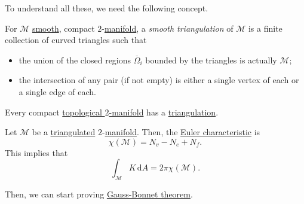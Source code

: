 To understand all these, we need the following concept.

\begin{definition}\label{def:smooth-triangulation}
	For \(\mathcal{M} \) \hyperref[def:smooth-manifold]{smooth}, compact \(2\)-\hyperref[def:smooth-manifold]{manifold}, a \emph{smooth triangulation} of \(\mathcal{M} \) is a finite collection of curved triangles such that
	\begin{itemize}
		\item the union of the closed regions \(\overline{\Omega} _i\) bounded by the triangles is actually \(\mathcal{M} \);
		\item the intersection of any pair (if not empty) is either a single vertex of each or a single edge of each.
	\end{itemize}
\end{definition}

\begin{theorem}
	Every compact \hyperref[def:topological-manifold]{topological \(2\)-manifold} has a \hyperref[def:smooth-triangulation]{triangulation}.
\end{theorem}

\begin{note}
	Let \(\mathcal{M} \) be a \hyperref[def:smooth-triangulation]{triangulated} \(2\)-\hyperref[def:smooth-manifold]{manifold}. Then, the \hyperref[def:Euler-characteristic]{Euler characteristic} is
	\[
		\chi (\mathcal{M} ) = N_v - N_e + N_f.
	\]
	This implies that
	\[
		\int _\mathcal{M} K \,\mathrm{d} A = 2 \pi \chi (\mathcal{M} ).
	\]
\end{note}

Then, we can start proving \hyperref[thm:Gauss-Bonnet]{Gauss-Bonnet theorem}.


